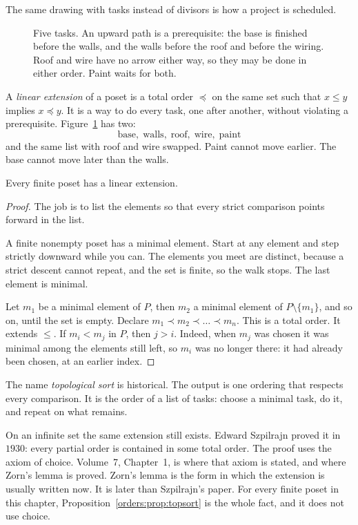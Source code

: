 The same drawing with tasks instead of divisors is how a project is scheduled.

\begin{figure}[ht]
\centering
{}
\caption{Five tasks. An upward path is a prerequisite: the base is finished before the walls, and the walls before the roof and before the wiring. Roof and wire have no arrow either way, so they may be done in either order. Paint waits for both.}
\label{orders:fig:tasks}
\end{figure}

A \emph{linear extension} of a poset is a total order $\preceq$ on the same set such that $x\le y$ implies $x\preceq y$. It is a way to do every task, one after another, without violating a prerequisite. Figure~\ref{orders:fig:tasks} has two:
\[
\text{base},\;\text{walls},\;\text{roof},\;\text{wire},\;\text{paint}
\]
and the same list with roof and wire swapped. Paint cannot move earlier. The base cannot move later than the walls.

\begin{proposition}\label{orders:prop:topsort}
Every finite poset has a linear extension.
\end{proposition}
\begin{proof}
The job is to list the elements so that every strict comparison points forward in the list.

A finite nonempty poset has a minimal element. Start at any element and step strictly downward while you can. The elements you meet are distinct, because a strict descent cannot repeat, and the set is finite, so the walk stops. The last element is minimal.

Let $m_1$ be a minimal element of $P$, then $m_2$ a minimal element of $P\setminus\{m_1\}$, and so on, until the set is empty. Declare $m_1\prec m_2\prec\dots\prec m_n$. This is a total order. It extends $\le$. If $m_i<m_j$ in $P$, then $j>i$. Indeed, when $m_j$ was chosen it was minimal among the elements still left, so $m_i$ was no longer there: it had already been chosen, at an earlier index.
\end{proof}

The name \emph{topological sort} is historical. The output is one ordering that respects every comparison. It is the order of a list of tasks: choose a minimal task, do it, and repeat on what remains.

On an infinite set the same extension still exists. Edward Szpilrajn proved it in $1930$: every partial order is contained in some total order. The proof uses the axiom of choice. Volume~7, Chapter~1, is where that axiom is stated, and where Zorn's lemma is proved. Zorn's lemma is the form in which the extension is usually written now. It is later than Szpilrajn's paper. For every finite poset in this chapter, Proposition~\ref{orders:prop:topsort} is the whole fact, and it does not use choice.

